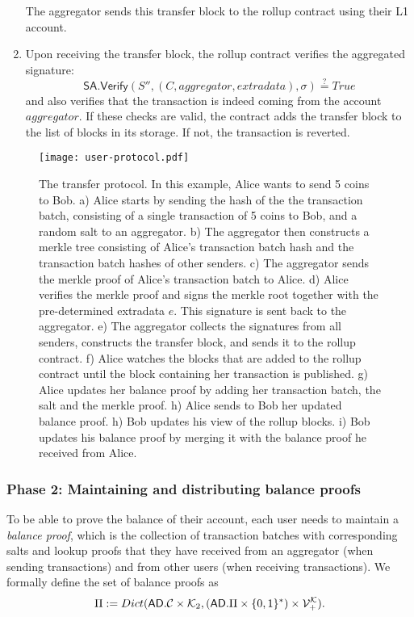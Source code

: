 \begin{enumerate}
	      The aggregator sends this transfer block to the rollup contract using their L1 account.
	\item Upon receiving the transfer block, the rollup contract verifies the aggregated signature: \[\mathsf{SA.Verify}(S'',(C,aggregator,extradata),\sigma) \stackrel{?}{=} True\] and also verifies that the transaction is indeed coming from the account \(aggregator\). If these checks are valid, the contract adds the transfer block to the list of blocks in its storage. If not, the transaction is reverted.
\end{enumerate}

\begin{figure}

	\centering
	\texttt{[image: user-protocol.pdf]}
	\caption{The transfer protocol. In this example, Alice wants to send 5 coins to Bob. a) Alice starts by sending the hash of the the transaction batch, consisting of a single transaction of 5 coins to Bob, and a random salt to an aggregator. b) The aggregator then constructs a merkle tree consisting of Alice's transaction batch hash and the transaction batch hashes of other senders. c) The aggregator sends the merkle proof of Alice's transaction batch to Alice. d) Alice verifies the merkle proof and signs the merkle root together with the pre-determined extradata \(e\). This signature is sent back to the aggregator. e) The aggregator collects the signatures from all senders, constructs the transfer block, and sends it to the rollup contract. f) Alice watches the blocks that are added to the rollup contract until the block containing her transaction is published. g) Alice updates her balance proof by adding her transaction batch, the salt and the merkle proof. h) Alice sends to Bob her updated balance proof. h) Bob updates his view of the rollup blocks. i) Bob updates his balance proof by merging it with the balance proof he received from Alice.}
	\label{fig:user-protocol}
\end{figure}

\subsubsection{Phase 2: Maintaining and distributing balance proofs}

To be able to prove the balance of their account, each user needs to maintain a \emph{balance proof}, which is the collection of transaction batches with corresponding salts and lookup proofs that they have received from an aggregator (when sending transactions) and from other users (when receiving transactions). We formally define \href{https://github.com/\repo FVIntmax/BalanceProof.lean#L27}{\ExternalLink} the set of balance proofs as \[\Pi := Dict(\mathsf{AD}.\mathcal{C} \times \mathcal{K}_2, (\mathsf{AD}.\Pi \times \{0,1\}^*) \times \mathcal{V}_+^{\mathcal{K}}).\]

